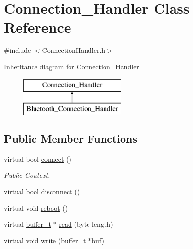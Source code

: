 \hypertarget{class_connection___handler}{\section{\-Connection\-\_\-\-Handler \-Class \-Reference}
\label{class_connection___handler}
}


{\ttfamily \#include $<$\-Connection\-Handler.\-h$>$}

\-Inheritance diagram for \-Connection\-\_\-\-Handler\-:\begin{figure}[H]
\begin{center}
\leavevmode
\includegraphics[height=2.000000cm]{class_connection___handler}
\end{center}
\end{figure}
\subsection*{\-Public \-Member \-Functions}
\begin{DoxyCompactItemize}
\item 
virtual bool \hyperlink{class_connection___handler_a391d131d7d802a8242080a6f44fdd348}{connect} ()
\begin{DoxyCompactList}\small\item\em \-Public \-Context. \end{DoxyCompactList}\item 
virtual bool \hyperlink{class_connection___handler_a7f266dbbf5c3f030de9a4732bdb17bd1}{disconnect} ()
\item 
virtual void \hyperlink{class_connection___handler_a0c565c93a515e30aca7c5fdf5bd7191e}{reboot} ()
\item 
virtual \hyperlink{structbuffer__t}{buffer\-\_\-t} $\ast$ \hyperlink{class_connection___handler_a5cdbdd2b6451b80ef35580ee8b57fce3}{read} (byte length)
\item 
virtual void \hyperlink{class_connection___handler_ad22f4aeae7b6f43d16ee67c841ff2efa}{write} (\hyperlink{structbuffer__t}{buffer\-\_\-t} $\ast$buf)
\end{DoxyCompactItemize}
